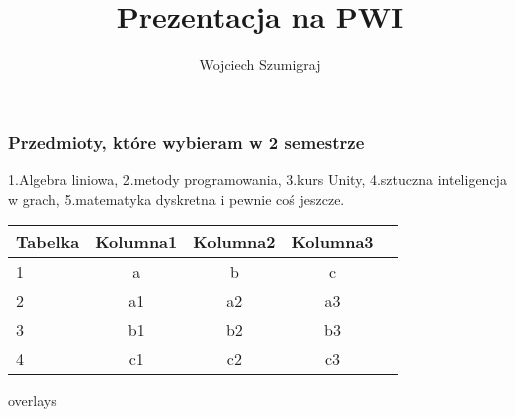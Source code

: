 \documentclass{beamer}
\title{Prezentacja na PWI}
\author{Wojciech Szumigraj}
\begin{document}
 \begin{frame}
 \titlepage
 \end{frame}
 
 \begin{frame}
 \frametitle{Przedmioty, które wybieram w 2 semestrze}
 1.Algebra liniowa, 
 2.metody programowania, 3.kurs Unity, 4.sztuczna inteligencja w grach, 5.matematyka dyskretna i pewnie coś jeszcze. 
 \end{frame}
 
 \begin{frame}
\begin{table}
\begin{tabular}{l | c | c | c | c }
Tabelka & Kolumna1 & Kolumna2 & Kolumna3 \\
\hline \hline
1 & a & b & c \\ 
2 & a1 & a2 & a3 \\
3 & b1 & b2 & b3 \\
4 & c1 & c2 & c3
\end{tabular}
\end{table}
\end{frame}
 
\begin{frame}{overlays}
 
\end{frame}
     
     
\end{document}
